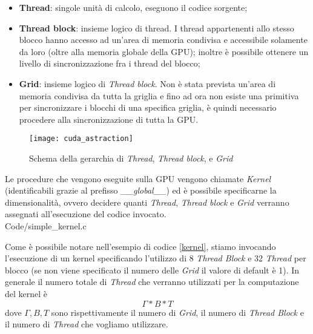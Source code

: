\begin{itemize}
    \item
        \textbf{Thread}: singole unità di calcolo, eseguono il codice sorgente;
    \item
        \textbf{Thread block}: insieme logico di thread. I thread appartenenti
        allo stesso blocco hanno accesso ad un'area di memoria condivisa e
        accessibile solamente da loro (oltre alla memoria globale della GPU);
        inoltre è possibile ottenere un livello di sincronizzazione fra i thread
        del blocco;
    \item
        \textbf{Grid}: insieme logico di \textit{Thread block}. Non è stata
        prevista un'area di memoria condivisa da tutta la griglia e fino ad ora non
        esiste una primitiva per sincronizzare i blocchi di una specifica
        griglia, è quindi necessario procedere alla sincronizzazione di
        tutta la GPU.
\end{itemize}

\begin{figure}[H]
    \centering
    \texttt{[image: cuda\_astraction]}
    \caption{Schema della gerarchia di \textit{Thread}, \textit{Thread block}, e
        \textit{Grid} \cite[p.~59]{nickolls2010gpu}}
\end{figure}

Le procedure che vengono eseguite sulla GPU vengono chiamate \textit{Kernel}
(identificabili grazie al prefisso \textit{\_\_global\_\_})
ed è possibile specificarne la dimensionalità, ovvero decidere quanti
\textit{Thread}, \textit{Thread block} e \textit{Grid} verranno assegnati
all'esecuzione del codice invocato.
\\

    {Code/simple_kernel.c}

Come è possibile notare nell'esempio di codice \ref{kernel}, stiamo invocando
l'esecuzione di un kernel specificando l'utilizzo di 8 \textit{Thread Block} e
32 \textit{Thread} per blocco (se non viene specificato il numero delle
\textit{Grid} il valore di default è 1). In generale il numero totale di
\textit{Thread} che verranno utilizzati per la computazione del kernel è
$$\Gamma * B * T$$ dove $\Gamma, B, T$
sono rispettivamente
il numero di \textit{Grid}, il numero di \textit{Thread Block} e il numero
di \textit{Thread} che vogliamo utilizzare.

